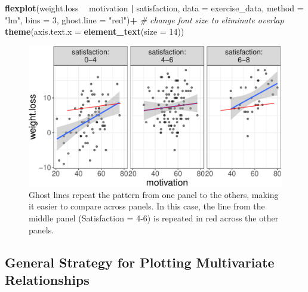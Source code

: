 \documentclass[
  man]{apa6}
\newenvironment{Shaded}{\begin{snugshade}}{\end{snugshade}}
\newcommand{\CommentTok}[1]{\textcolor[rgb]{0.56,0.35,0.01}{\textit{#1}}}
\newcommand{\DataTypeTok}[1]{\textcolor[rgb]{0.13,0.29,0.53}{#1}}
\newcommand{\DecValTok}[1]{\textcolor[rgb]{0.00,0.00,0.81}{#1}}
\newcommand{\KeywordTok}[1]{\textcolor[rgb]{0.13,0.29,0.53}{\textbf{#1}}}
\newcommand{\NormalTok}[1]{#1}
\newcommand{\OperatorTok}[1]{\textcolor[rgb]{0.81,0.36,0.00}{\textbf{#1}}}
\newcommand{\StringTok}[1]{\textcolor[rgb]{0.31,0.60,0.02}{#1}}
\begin{document}
\begin{Shaded}
\begin{Highlighting}[]
\KeywordTok{flexplot}\NormalTok{(weight.loss }\OperatorTok{~}\StringTok{ }\NormalTok{motivation }\OperatorTok{|}\StringTok{ }\NormalTok{satisfaction, }
             \DataTypeTok{data =}\NormalTok{ exercise_data, }\DataTypeTok{method =} \StringTok{"lm"}\NormalTok{, }
             \DataTypeTok{bins =} \DecValTok{3}\NormalTok{, }\DataTypeTok{ghost.line =} \StringTok{"red"}\NormalTok{)}\OperatorTok{+}
\StringTok{  }\CommentTok{# change font size to eliminate overlap}
\StringTok{    }\KeywordTok{theme}\NormalTok{(}\DataTypeTok{axis.text.x =} 
            \KeywordTok{element_text}\NormalTok{(}\DataTypeTok{size =} \DecValTok{14}\NormalTok{))}
\end{Highlighting}
\end{Shaded}

\begin{figure}

{\centering \includegraphics[width=0.8\linewidth]{flexplot_psychmeth_files/figure-latex/ghost-1} 

}

\caption{Ghost lines repeat the pattern from one panel to the others, making it easier to compare across panels. In this case, the line from the middle panel (Satisfaction = 4-6) is repeated in red across the other panels. \label{fig:ghost}}\label{fig:ghost}
\end{figure}

\hypertarget{general-strategy-for-plotting-multivariate-relationships}{%
\subsection{General Strategy for Plotting Multivariate Relationships}\label{general-strategy-for-plotting-multivariate-relationships}}
\end{document}
